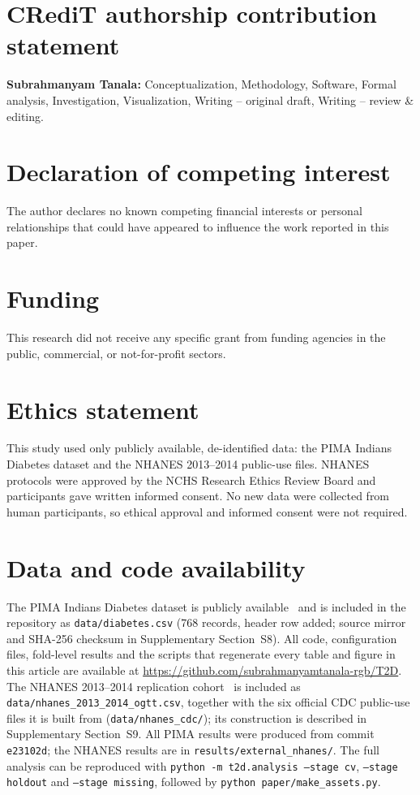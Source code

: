 \section*{CRediT authorship contribution statement}
\textbf{Subrahmanyam Tanala:} Conceptualization, Methodology, Software, Formal analysis, Investigation, Visualization, Writing -- original draft, Writing -- review \& editing.

\section*{Declaration of competing interest}
The author declares no known competing financial interests or personal relationships that could have appeared to influence the work reported in this paper.

\section*{Funding}
This research did not receive any specific grant from funding agencies in the public, commercial, or not-for-profit sectors.

\section*{Ethics statement}
This study used only publicly available, de-identified data: the PIMA Indians Diabetes dataset and the NHANES 2013--2014 public-use files. NHANES protocols were approved by the NCHS Research Ethics Review Board and participants gave written informed consent. No new data were collected from human participants, so ethical approval and informed consent were not required.

\section*{Data and code availability}
The PIMA Indians Diabetes dataset is publicly available~\cite{pimadata} and is included in the repository as \texttt{data/diabetes.csv} (768 records, header row added; source mirror and SHA-256 checksum in Supplementary Section~S8). All code, configuration files, fold-level results and the scripts that regenerate every table and figure in this article are available at \url{https://github.com/subrahmanyamtanala-rgb/T2D}. %
The NHANES 2013--2014 replication cohort~\cite{nhanes2013} is included as \texttt{data/nhanes\_2013\_2014\_ogtt.csv}, together with the six official CDC public-use files it is built from (\texttt{data/nhanes\_cdc/}); its construction is described in Supplementary Section~S9. All PIMA results were produced from commit \texttt{e23102d}; the NHANES results are in \texttt{results/external\_nhanes/}. The full analysis can be reproduced with \texttt{python -m t2d.analysis --stage cv}, \texttt{--stage holdout} and \texttt{--stage missing}, followed by \texttt{python paper/make\_assets.py}.

